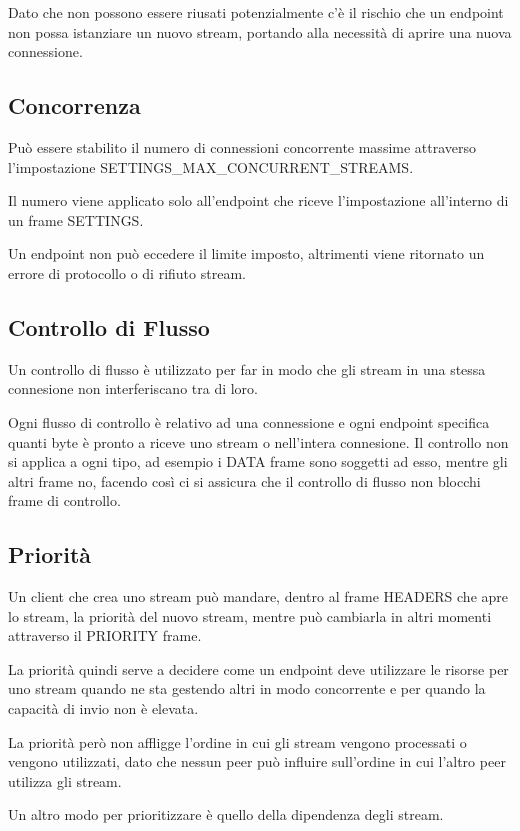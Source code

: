 \documentclass[12pt, a4paper]{article} %
\begin{document}
Dato che non possono essere riusati potenzialmente c'è il rischio che un endpoint non possa istanziare un nuovo stream, portando alla necessità di aprire una nuova connessione.

\subsection{Concorrenza}
Può essere stabilito il numero di connessioni concorrente massime attraverso l'impostazione SETTINGS\_MAX\_CONCURRENT\_STREAMS.

Il numero viene applicato solo all'endpoint che riceve l'impostazione all'interno di un frame SETTINGS.

Un endpoint non può eccedere il limite imposto, altrimenti viene ritornato un errore di protocollo o di rifiuto stream.

\subsection{Controllo di Flusso}
Un controllo di flusso è utilizzato per far in modo che gli stream in una stessa connesione non interferiscano tra di loro.

Ogni flusso di controllo è relativo ad una connessione e ogni endpoint specifica quanti byte è pronto a riceve uno stream o nell'intera connesione.
Il controllo non si applica a ogni tipo, ad esempio i DATA frame sono soggetti ad esso, mentre gli altri frame no, facendo così ci si assicura che il controllo di flusso non blocchi frame di controllo.

\subsection{Priorità}
Un client che crea uno stream può mandare, dentro al frame HEADERS che apre lo stream, la priorità del nuovo stream, mentre può cambiarla in altri momenti attraverso il PRIORITY frame.

La priorità quindi serve a decidere come un endpoint deve utilizzare le risorse per uno stream quando ne sta gestendo altri in modo concorrente e per quando la capacità di invio non è elevata.

La priorità però non affligge l'ordine in cui gli stream vengono processati o vengono utilizzati, dato che nessun peer può influire sull'ordine in cui l'altro peer utilizza gli stream.

Un altro modo per prioritizzare è quello della dipendenza degli stream.
\end{document}
